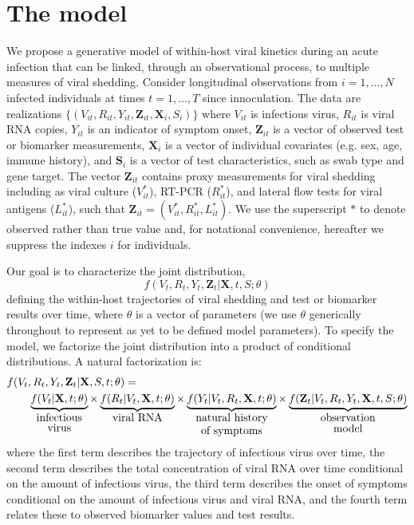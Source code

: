 \documentclass[12pt]{article}
\begin{document}
\section{The model} \label{sec:model}
We propose a generative model of within-host viral kinetics during an acute infection that can be linked, through an observational process, to multiple measures of viral shedding. Consider longitudinal observations from $i = 1, \ldots, N$ infected individuals at times $t = 1, \ldots, T$ since innoculation. The data are realizations $\{(V_{it}, R_{it}, Y_{it}, \mathbf{Z}_{it}, \mathbf{X}_i, S_{i})\}$ where $V_{it}$ is infectious virus, $R_{it}$ is viral RNA copies, $Y_{it}$ is an indicator of symptom onset, $\mathbf{Z}_{it}$ is a vector of observed test or biomarker measurements, $\mathbf{X}_i$ is a vector of individual covariates (e.g. sex, age, immune history), and $\mathbf{S}_i$ is a vector of test characteristics, such as swab type and gene target. The vector $\mathbf{Z}_{it}$ contains proxy measurements for viral shedding including as viral culture ($V^*_{it}$), RT-PCR ($R^*_{it}$), and lateral flow tests for viral antigens ($L^*_{it}$), such that $\mathbf{Z}_{it} = (V^*_{it}, R^*_{it}, L^*_{it})$. We use the superscript $*$ to denote observed rather than true value and, for notational convenience, hereafter we suppress the indexes $i$ for individuals. 

Our goal is to characterize the joint distribution, 
$$
f(V_t, R_t, Y_t, \mathbf{Z}_t | \mathbf{X}, t, S; \theta)
$$
defining the within-host trajectories of viral shedding and test or biomarker results over time, where $\theta$ is a vector of parameters (we use $\theta$ generically throughout to represent as yet to be defined model parameters). To specify the model, we factorize the joint distribution into a product of conditional distributions. A natural factorization is:
\begin{align*}
    f(&V_t, R_t, Y_t, \mathbf{Z}_t | \mathbf{X}, S, t; \theta) = \\ & \quad \underbrace{f(V_t | \mathbf{X}, t; \theta)}_{\shortstack{infectious \\ virus}} \times \underbrace{f(R_t | V_t, \mathbf{X}, t; \theta)}_{\shortstack{viral RNA}} \times \underbrace{f(Y_t | V_t, R_t, \mathbf{X}, t; \theta)}_{\shortstack{natural history \\ of symptoms}} \times \underbrace{f(\mathbf{Z}_t | V_t, R_t, Y_t, \mathbf{X}, t, S; \theta)}_{\shortstack{observation \\ model}}
\end{align*}
where the first term describes the trajectory of infectious virus over time, the second term describes the total concentration of viral RNA over time conditional on the amount of infectious virus, the third term describes the onset of symptoms conditional on the amount of infectious virus and viral RNA, and the fourth term relates these to observed biomarker values and test results.
\end{document}
